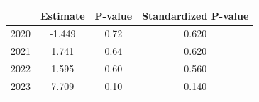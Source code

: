 \begin{tabular}{lccc}
\hline
 & Estimate & P-value & Standardized P-value \\
\hline
2020 & -1.449 & 0.72 & 0.620 \\
2021 & 1.741 & 0.64 & 0.620 \\
2022 & 1.595 & 0.60 & 0.560 \\
2023 & 7.709 & 0.10 & 0.140 \\
\hline
\end{tabular}
